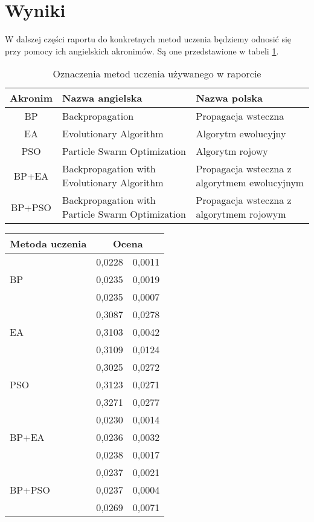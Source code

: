 \documentclass[11pt,a4paper,oneside]{report}
\begin{document}
\section{Wyniki}

W dalszej części raportu do konkretnych metod uczenia będziemy odnosić się przy pomocy ich angielskich akronimów. Są one przedstawione w tabeli \ref{table:acronyms}.

\begin{table}[H]
	\caption{Oznaczenia metod uczenia używanego w raporcie \label{table:acronyms}}
	\begin{tabularx}{\linewidth}{|c|X|X|}
		\hline
		Akronim & Nazwa angielska & Nazwa polska \\
		\hline \hline
		BP & Backpropagation & Propagacja wsteczna \\ \hline
		EA & Evolutionary Algorithm & Algorytm ewolucyjny \\ \hline
		PSO & Particle Swarm Optimization & Algorytm rojowy \\ \hline
		BP+EA & Backpropagation with Evolutionary Algorithm & Propagacja wsteczna z algorytmem ewolucyjnym \\ \hline
		BP+PSO & Backpropagation with Particle Swarm Optimization & Propagacja wsteczna z algorytmem rojowym \\ \hline
	\end{tabularx}
\end{table}


\begin{table}[H]
	\caption{Porównanie efektywności różnych metod uczenia \label{table:compare}. Dla każdej metody przedstawiono 3 najlepsze wyniki uzyskane podczas przeprowadzania badań.}
	\centering 
	\begin{longtable}{|l|r@{$\pm$}r|}
		\hline
		Metoda uczenia & \multicolumn{2}{|c|}{Ocena} \\
		\hline \hline
		\multirow{3}{*}{BP} & 0,0228 & 0,0011 \\ 
		 & 0,0235 & 0,0019 \\ 
		 & 0,0235 & 0,0007 \\ \hline
		\multirow{3}{*}{EA} & 0,3087 & 0,0278 \\ 
		 & 0,3103 & 0,0042 \\ 
		 & 0,3109 & 0,0124 \\ \hline
		\multirow{3}{*}{PSO} & 0,3025 & 0,0272 \\ 
		 & 0,3123 & 0,0271 \\ 
		 & 0,3271 & 0,0277 \\ \hline
		\multirow{3}{*}{BP+EA} & 0,0230 & 0,0014 \\
		 & 0,0236 & 0,0032 \\
		 & 0,0238 & 0,0017 \\ \hline
		\multirow{3}{*}{BP+PSO} & 0,0237 & 0,0021 \\
		 & 0,0237 & 0,0004 \\
		 & 0,0269 & 0,0071 \\ \hline
	\end{longtable}
\end{table}
\end{document}
